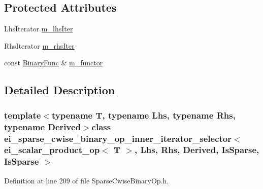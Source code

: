 \subsection*{Protected Attributes}
\begin{DoxyCompactItemize}
\item 
Lhs\-Iterator \hyperlink{classei__sparse__cwise__binary__op__inner__iterator__selector_3_01ei__scalar__product__op_3_01_t3642a5ce0210f5e8cb62d8f3cd863802_a2d1b3e850470fdb2ceec5c6e15502133}{m\-\_\-lhs\-Iter}
\item 
Rhs\-Iterator \hyperlink{classei__sparse__cwise__binary__op__inner__iterator__selector_3_01ei__scalar__product__op_3_01_t3642a5ce0210f5e8cb62d8f3cd863802_a4842a03af5badb257e9e6f1aaf161610}{m\-\_\-rhs\-Iter}
\item 
const \hyperlink{structei__scalar__product__op}{Binary\-Func} \& \hyperlink{classei__sparse__cwise__binary__op__inner__iterator__selector_3_01ei__scalar__product__op_3_01_t3642a5ce0210f5e8cb62d8f3cd863802_ad0752ec995540205afbfffa15e3e3762}{m\-\_\-functor}
\end{DoxyCompactItemize}


\subsection{Detailed Description}
\subsubsection*{template$<$typename T, typename Lhs, typename Rhs, typename Derived$>$class ei\-\_\-sparse\-\_\-cwise\-\_\-binary\-\_\-op\-\_\-inner\-\_\-iterator\-\_\-selector$<$ ei\-\_\-scalar\-\_\-product\-\_\-op$<$ T $>$, Lhs, Rhs, Derived, Is\-Sparse, Is\-Sparse $>$}



Definition at line 209 of file Sparse\-Cwise\-Binary\-Op.\-h.



